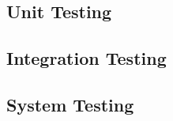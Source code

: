 \subsection{Unit Testing}
\lipsum[17]

\subsection{Integration Testing}
\lipsum[18]

\subsection{System Testing}
\lipsum[19]